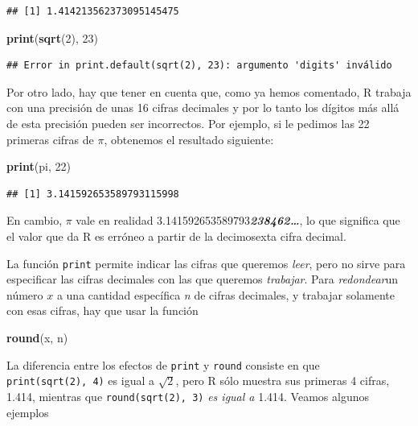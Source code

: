 \documentclass[]{book}
\newenvironment{Shaded}{\begin{snugshade}}{\end{snugshade}}
\newcommand{\DecValTok}[1]{\textcolor[rgb]{0.00,0.00,0.81}{#1}}
\newcommand{\KeywordTok}[1]{\textcolor[rgb]{0.13,0.29,0.53}{\textbf{#1}}}
\newcommand{\NormalTok}[1]{#1}
\theoremstyle{definition}
\theoremstyle{definition}
\theoremstyle{definition}
\theoremstyle{remark}
\begin{document}
\begin{verbatim}
## [1] 1.414213562373095145475
\end{verbatim}

\begin{Shaded}
\begin{Highlighting}[]
\KeywordTok{print}\NormalTok{(}\KeywordTok{sqrt}\NormalTok{(}\DecValTok{2}\NormalTok{), }\DecValTok{23}\NormalTok{)}
\end{Highlighting}
\end{Shaded}

\begin{verbatim}
## Error in print.default(sqrt(2), 23): argumento 'digits' inválido
\end{verbatim}

Por otro lado, hay que tener en cuenta que, como ya hemos comentado, R trabaja con una precisión de unas 16 cifras decimales y por lo tanto los dígitos más allá de esta precisión pueden ser incorrectos. Por ejemplo, si le pedimos las 22 primeras cifras de \(\pi\), obtenemos el resultado siguiente:

\begin{Shaded}
\begin{Highlighting}[]
\KeywordTok{print}\NormalTok{(pi, }\DecValTok{22}\NormalTok{)}
\end{Highlighting}
\end{Shaded}

\begin{verbatim}
## [1] 3.141592653589793115998
\end{verbatim}

En cambio, \(\pi\) vale en realidad 3.141592653589793\textbf{\emph{238462\ldots{}}}, lo que significa que el valor que da R es erróneo a partir de la decimosexta cifra decimal.

La función \texttt{print} permite indicar las cifras que queremos \emph{leer}, pero no sirve para especificar las cifras decimales con las que queremos \emph{trabajar}.
Para \emph{redondear}un número \(x\) a una cantidad específica \emph{n} de cifras decimales, y trabajar solamente con esas cifras, hay que usar la función

\begin{Shaded}
\begin{Highlighting}[]
\KeywordTok{round}\NormalTok{(x, n)}
\end{Highlighting}
\end{Shaded}

La diferencia entre los efectos de \texttt{print} y \texttt{round} consiste en que \texttt{print(sqrt(2),\ 4)} es igual a \(\sqrt{2}\), pero R sólo muestra sus primeras 4 cifras, 1.414, mientras que \texttt{round(sqrt(2),\ 3)} \emph{es igual a} 1.414. Veamos algunos ejemplos
\end{document}
